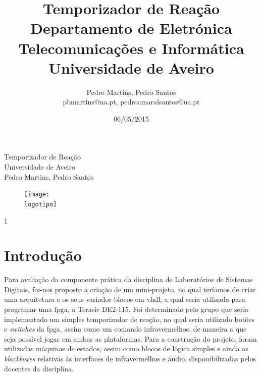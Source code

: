 \documentclass[a4paper,11pt,onecolumn]{report}
\begin{document}
%
\def\titulo{Temporizador de Reação}
\def\data{06/05/2015}
\def\autores{Pedro Martins, Pedro Santos}
\def\autorescontactos{pbmartins@ua.pt, pedroamaralsantos@ua.pt}
\def\versao{1}
\def\departamento{Departamento de Eletrónica Telecomunicações e Informática}
\def\empresa{Universidade de Aveiro}
\def\logotipo{ua.pdf}
%
%
\begin{titlepage}

\begin{center}
%
\vspace*{50mm}
%
{\Huge \titulo}\\ 
%
\vspace{10mm}
%
{\Large \empresa}\\
%
\vspace{10mm}
%
{\LARGE \autores}\\ 
%
%
\vspace{30mm}
%
\begin{figure}[h]
\center
\texttt{[image: \\logotipo]}
\end{figure}
%
\vspace{30mm}
\end{center}
%
\begin{flushright}
\versao
\end{flushright}
\end{titlepage}

%
%
%
%
\title{%
{\Huge\textbf{\titulo}}\\
{\Large \departamento\\ \empresa}
}
%
\author{%
    \autores \\
    \autorescontactos
}
%
\date{\data}
%
\maketitle

%
%

\tableofcontents


\clearpage
{}

\chapter{Introdução}
\label{chap.introducao}

Para avaliação da componente prática da disciplina de Laboratórios de Sistemas Digitais, foi-nos proposto a criação de um mini-projeto, no qual teríamos de criar uma arquitetura e os seus variados blocos em \ac{vhdl}, a qual seria utilizada para programar uma \ac{fpga}, a Terasic DE2-115. Foi determinado pelo grupo que seria implementado um simples temporizador de reação, no qual seria utilizado botões e \textit{switches} da \ac{fpga}, assim como um comando infravermelhos, de maneira a que seja possível jogar em ambas as plataformas. Para a construção do projeto, foram utilizadas máquinas de estados, assim como blocos de lógica simples e ainda as \textit{blackboxes} relativas às interfaces de infravermelhos e áudio, disponibilizadas pelos docentes da disciplina.
\end{document}

